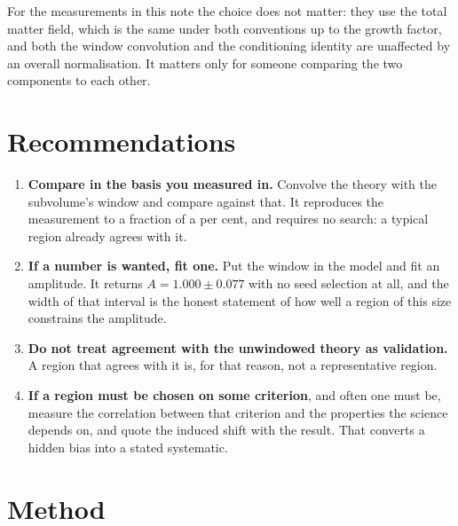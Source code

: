 \documentclass[12pt]{article}
\begin{document}
For the measurements in this note the choice does not matter: they use the total
matter field, which is the same under both conventions up to the growth factor,
and both the window convolution and the conditioning identity are unaffected by
an overall normalisation. It matters only for someone comparing the two
components to each other.

\section{Recommendations}
\label{sec:recommendations}

\begin{enumerate}
\item \textbf{Compare in the basis you measured in.} Convolve the theory with
  the subvolume's window and compare against that. It reproduces the measurement
  to a fraction of a per cent, and requires no search: a typical region already
  agrees with it.

\item \textbf{If a number is wanted, fit one.} Put the window in the model and
  fit an amplitude. It returns $A = 1.000 \pm 0.077$ with no seed selection at
  all, and the width of that interval is the honest statement of how well a
  region of this size constrains the amplitude.

\item \textbf{Do not treat agreement with the unwindowed theory as validation.}
  A region that agrees with it is, for that reason, not a representative region.

\item \textbf{If a region must be chosen on some criterion}, and often one must
  be, measure the correlation between that criterion and the properties the
  science depends on, and quote the induced shift with the result. That converts
  a hidden bias into a stated systematic.
\end{enumerate}

\section{Method}
\label{sec:method}
\end{document}
